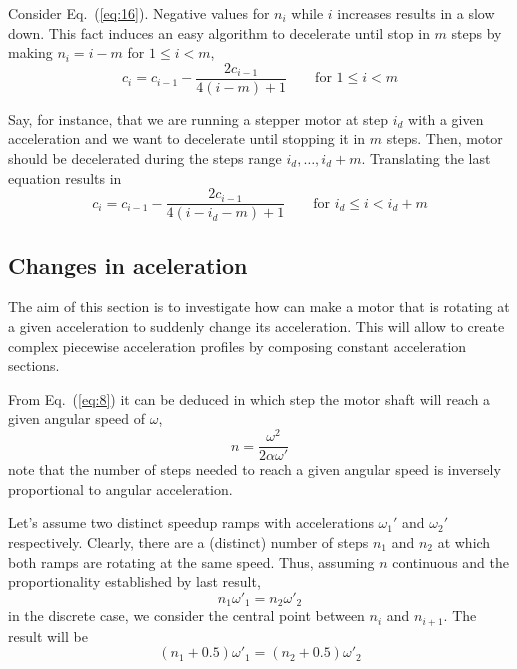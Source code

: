 \documentclass[a4paper]{article}
\begin{document}
Consider Eq.~(\ref{eq:16}). Negative values for $n_i$ while $i$
increases results in a slow down. This fact induces an easy algorithm
to decelerate until stop in $m$ steps by making $n_i=i-m$ for
$1\leq i<m$,
\begin{equation}
  \label{eq:18}
  c_i = c_{i-1} - \frac{2c_{i-1}}{4(i - m) + 1} \qquad\text{for $1\leq i<m$}  
\end{equation}

Say, for instance, that we are running a stepper motor at step $i_d$
with a given acceleration and we want to decelerate until stopping it
in $m$ steps. Then, motor should be decelerated during the steps range
$i_d,\dots,i_d+m$. Translating the last equation results in
\begin{equation*}
    c_i  = c_{i-1} - \frac{2c_{i-1}}{4(i-i_d - m) + 1} \qquad\text{for $i_d\leq i<i_d+m$}
\end{equation*}




\subsection{Changes in aceleration}

The aim of this section is to investigate how can make a motor that is
rotating at a given acceleration to suddenly change its
acceleration. This will allow to create complex piecewise acceleration
profiles by composing constant acceleration sections.

From Eq.~(\ref{eq:8}) it can be deduced in which step the motor shaft
will reach a given angular speed of $\omega$,
\begin{equation*}
  n = \frac{\omega^2}{2\alpha\omega'}  
\end{equation*}
note that the number of steps needed to reach a given angular speed is
inversely proportional to angular acceleration.


Let's assume two distinct speedup ramps with accelerations $\omega_1'$
and $\omega_2'$ respectively. Clearly, there are a (distinct) number
of steps $n_1$ and $n_2$ at which both ramps are rotating at the same
speed. Thus, assuming $n$ continuous and the proportionality
established by last result,
\begin{equation*}
   n_1\omega'_1 = n_2\omega'_2
\end{equation*}
in the discrete case, we consider the central point between $n_i$ and
$n_{i+1}$. The result will be
\begin{equation}
  \label{eq:21}
  (n_1+0.5)\omega'_1 = (n_2+0.5)\omega'_2
\end{equation}
\end{document}
